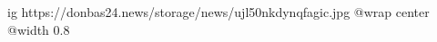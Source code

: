  
 
 
 
 

\ifcmt
  ig https://donbas24.news/storage/news/ujl50nkdynqfagic.jpg
  @wrap center
  @width 0.8
\fi
